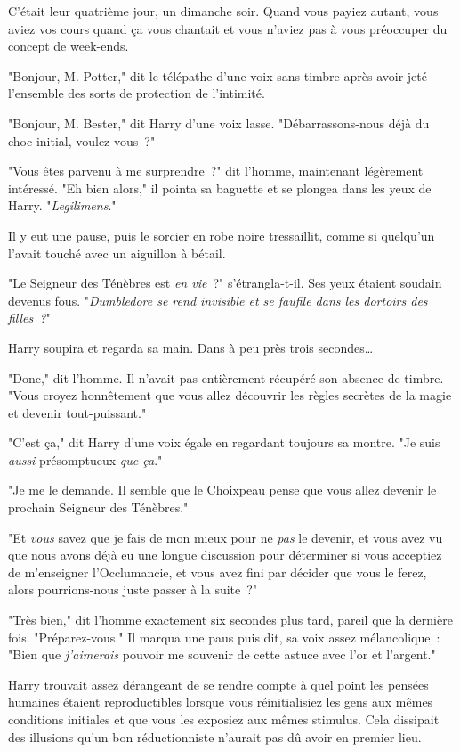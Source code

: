 C'était leur quatrième jour, un dimanche soir. Quand vous payiez autant, vous aviez vos cours quand ça vous chantait et vous n'aviez pas à vous préoccuper du concept de week-ends.

"Bonjour, M. Potter," dit le télépathe d'une voix sans timbre après avoir jeté l'ensemble des sorts de protection de l'intimité.

"Bonjour, M. Bester," dit Harry d'une voix lasse. "Débarrassons-nous déjà du choc initial, voulez-vous~?"

"Vous êtes parvenu à me surprendre~?" dit l'homme, maintenant légèrement intéressé. "Eh bien alors," il pointa sa baguette et se plongea dans les yeux de Harry. "\emph{Legilimens}."

Il y eut une pause, puis le sorcier en robe noire tressaillit, comme si quelqu'un l'avait touché avec un aiguillon à bétail.

"Le Seigneur des Ténèbres est \emph{en vie}~?" s'étrangla-t-il. Ses yeux étaient soudain devenus fous. "\emph{Dumbledore se rend invisible et se faufile dans les dortoirs des filles~?}"

Harry soupira et regarda sa main. Dans à peu près trois secondes…

"Donc," dit l'homme. Il n'avait pas entièrement récupéré son absence de timbre. "Vous croyez honnêtement que vous allez découvrir les règles secrètes de la magie et devenir tout-puissant."

"C'est ça," dit Harry d'une voix égale en regardant toujours sa montre. "Je suis \emph{aussi} présomptueux \emph{que ça}."

"Je me le demande. Il semble que le Choixpeau pense que vous allez devenir le prochain Seigneur des Ténèbres."

"Et \emph{vous} savez que je fais de mon mieux pour ne \emph{pas} le devenir, et vous avez vu que nous avons déjà eu une longue discussion pour déterminer si vous acceptiez de m'enseigner l'Occlumancie, et vous avez fini par décider que vous le ferez, alors pourrions-nous juste passer à la suite~?"

"Très bien," dit l'homme exactement six secondes plus tard, pareil que la dernière fois. "Préparez-vous." Il marqua une paus puis dit, sa voix assez mélancolique~: "Bien que \emph{j'aimerais} pouvoir me souvenir de cette astuce avec l'or et l'argent."

Harry trouvait assez dérangeant de se rendre compte à quel point les pensées humaines étaient reproductibles lorsque vous réinitialisiez les gens aux mêmes conditions initiales et que vous les exposiez aux mêmes stimulus. Cela dissipait des illusions qu'un bon réductionniste n'aurait pas dû avoir en premier lieu.

